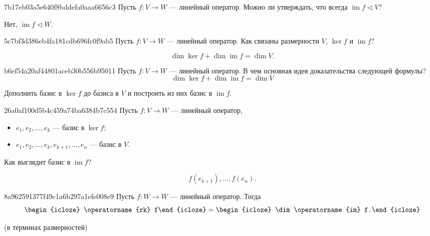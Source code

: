 \begin{note}{7b17eb03a5e640f8bddefa0aaa6656c3}
    Пусть \( f : V \to W \) --- линейный оператор. Можно ли утверждать, что всегда \( \operatorname{im} f \triangleleft V \)?

    \begin{cloze}{1}
        Нет, \( \operatorname{im} f \triangleleft W \).
    \end{cloze}
\end{note}

\begin{note}{5c7bf3d386eb4fa181cdb696fc0f9ab5}
    Пусть \( f : V \to W \) --- линейный оператор. Как связаны размерности \( V \), \( \ker f \) и \( \operatorname{im} f \)?

    \begin{cloze}{1}
        \[
            \dim \ker f + \dim \operatorname{im} f = \dim V.
        \]
    \end{cloze}
\end{note}

\begin{note}{b6ef54a20af44801aceb30b556b95011}
    Пусть \( f : V \to W \) --- линейный оператор. В чем основная идея доказательства следующей формулы?
    \[
        \dim \ker f + \dim \operatorname{im} f = \dim V
    \]

    \begin{cloze}{1}
        Дополнить базис в \( \ker f \) до базиса в \( V \) и построить из них базис в \( \operatorname{im} f \).
    \end{cloze}
\end{note}

\begin{note}{26a0af100d5b4c459a74ba6384b7c554}
    Пусть \( f : V \to W \) --- линейный оператор,
    \begin{itemize}
        \item \( e_1,e_2, \ldots, e_k  \) --- базис в \( \ker f \);
        \item \( e_1,e_2, \ldots, e_k, e_{k+1}, \ldots, e_n  \) --- базис в \( V \).
    \end{itemize}
    Как выглядит базис в \( \operatorname{im} f \)?

    \begin{cloze}{1}
        \[
            f(e_{k+1}), \ldots, f(e_n).
        \]
    \end{cloze}
\end{note}

\begin{note}{8a962591377f49c1a6b297a1efe008e9}
    Пусть \( f : W \to W \) --- линейный оператор. Тогда
    \[
        \begin{icloze}{2}\operatorname{rk} f\end{icloze} = \begin{icloze}{1}\dim \operatorname{im} f.\end{icloze}
    \]

    \begin{center}
        \tiny (в терминах размерностей)
    \end{center}
\end{note}

